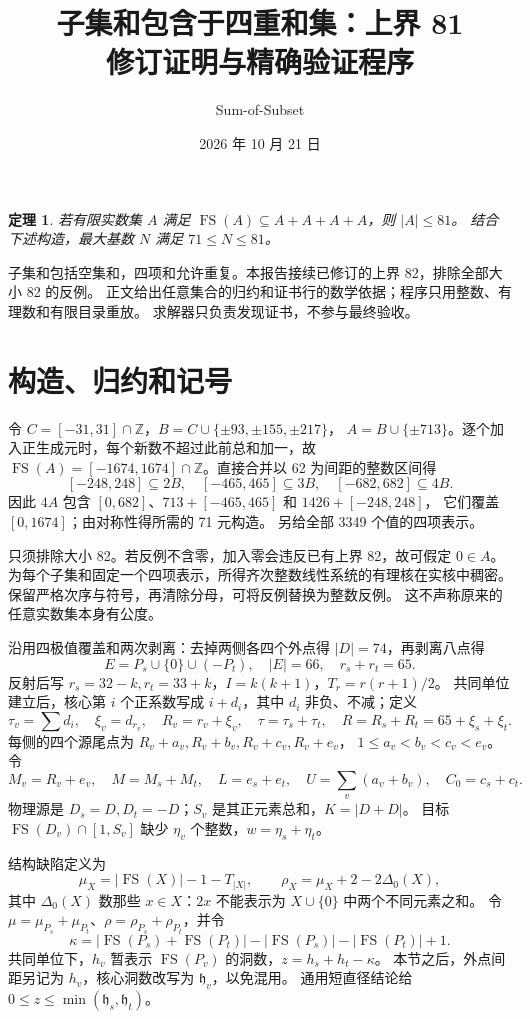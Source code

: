 \documentclass[11pt,a4paper]{article}
\title{子集和包含于四重和集：上界 81\\\large 修订证明与精确验证程序}
\author{Sum-of-Subset}\date{2026 年 10 月 21 日}
\newcommand{\FS}{\operatorname{FS}}\newcommand{\Z}{\mathbb Z}\newcommand{\T}{T}
\newtheorem{theorem}{定理}\newtheorem{lemma}{引理}
\begin{document}
\maketitle

\begin{theorem}\label{thm:main}
若有限实数集 $A$ 满足 $\FS(A)\subseteq A+A+A+A$，则 $|A|\le81$。
结合下述构造，最大基数 $N$ 满足 $71\le N\le81$。
\end{theorem}
子集和包括空集和，四项和允许重复。本报告接续已修订的上界 82，排除全部大小 82 的反例。
正文给出任意集合的归约和证书行的数学依据；程序只用整数、有理数和有限目录重放。
求解器只负责发现证书，不参与最终验收。

\section{构造、归约和记号}
令 $C=[-31,31]\cap\Z$，$B=C\cup\{\pm93,\pm155,\pm217\}$，
$A=B\cup\{\pm713\}$。逐个加入正生成元时，每个新数不超过此前总和加一，故
$\FS(A)=[-1674,1674]\cap\Z$。直接合并以 62 为间距的整数区间得
\[
 [-248,248]\subseteq2B,\quad[-465,465]\subseteq3B,\quad[-682,682]\subseteq4B.
\]
因此 $4A$ 包含 $[0,682]$、$713+[-465,465]$ 和 $1426+[-248,248]$，
它们覆盖 $[0,1674]$；由对称性得所需的 71 元构造。
 另给全部 3349 个值的四项表示。

只须排除大小 82。若反例不含零，加入零会违反已有上界 82，故可假定 $0\in A$。
为每个子集和固定一个四项表示，所得齐次整数线性系统的有理核在实核中稠密。
保留严格次序与符号，再清除分母，可将反例替换为整数反例。
这不声称原来的任意实数集本身有公度。

沿用四极值覆盖和两次剥离：去掉两侧各四个外点得 $|D|=74$，再剥离八点得
\[
 E=P_s\cup\{0\}\cup(-P_t),\quad |E|=66,\quad r_s+r_t=65.
\]
反射后写 $r_s=32-k,r_t=33+k$，$I=k(k+1)$，$T_r=r(r+1)/2$。
共同单位建立后，核心第 $i$ 个正系数写成 $i+d_i$，其中 $d_i$ 非负、不减；定义
\[
 \tau_v=\sum d_i,\quad \xi_v=d_{r_v},\quad R_v=r_v+\xi_v,
 \quad \tau=\tau_s+\tau_t,\quad R=R_s+R_t=65+\xi_s+\xi_t.
\]
每侧的四个源尾点为 $R_v+a_v,R_v+b_v,R_v+c_v,R_v+e_v$，
$1\le a_v<b_v<c_v<e_v$。令
\[
 M_v=R_v+e_v,\quad M=M_s+M_t,\quad L=e_s+e_t,
 \quad U=\sum_v(a_v+b_v),\quad C_0=c_s+c_t.
\]
物理源是 $D_s=D,D_t=-D$；$S_v$ 是其正元素总和，$K=|D+D|$。
目标 $\FS(D_v)\cap[1,S_v]$ 缺少 $\eta_v$ 个整数，$w=\eta_s+\eta_t$。

结构缺陷定义为
\[
 \mu_X=|\FS(X)|-1-T_{|X|},\qquad \rho_X=\mu_X+2-2\Delta_0(X),
\]
其中 $\Delta_0(X)$ 数那些 $x\in X$：$2x$ 不能表示为 $X\cup\{0\}$ 中两个不同元素之和。
令 $\mu=\mu_{P_s}+\mu_{P_t}$、$\rho=\rho_{P_s}+\rho_{P_t}$，并令
\[
 \kappa=|\FS(P_s)+\FS(P_t)|-|\FS(P_s)|-|\FS(P_t)|+1.
\]
共同单位下，$h_v$ 暂表示 $\FS(P_v)$ 的洞数，$z=h_s+h_t-\kappa$。
本节之后，外点间距另记为 $h_v$，核心洞数改写为 $\mathfrak h_v$，以免混用。
通用短直径结论给 $0\le z\le\min(\mathfrak h_s,\mathfrak h_t)$。
\end{document}
